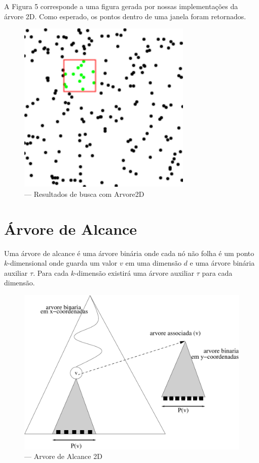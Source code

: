 A Figura 5 corresponde a uma figura gerada por nossas implementações da árvore 2D. Como esperado, os
pontos dentro de uma janela foram retornados.
\begin{figure}[scale=0.5]
    \caption{\label{fig:Fig_54} — Resultados de busca com Arvore2D}
    \begin{center}
        \includegraphics{images/points.pdf}
    \end{center}
\end{figure}
\clearpage



\section{Árvore de Alcance}

Uma árvore de alcance é  uma árvore binária onde cada nó não folha é um ponto $k$-dimensional
onde guarda um valor $v$ em uma dimensão $d$ e uma árvore binária auxiliar $\tau$. Para cada $k$-dimensão
existirá uma árvore auxiliar $\tau$ para cada dimensão.

\begin{figure}[htb]
    \caption{\label{fig:Fig_26} — Arvore de Alcance 2D}
    \begin{center}
        \includegraphics[scale=0.5]{images/range_tree1.pdf}
    \end{center}
\end{figure}

